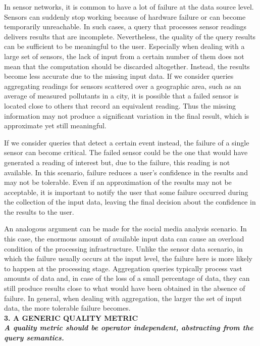 In sensor networks, it is common to have a lot of failure at the data source level. Sensors can suddenly
stop working because of hardware failure or can become temporarily unreachable. In such cases, a query
that processes sensor readings delivers results that are incomplete. Nevertheless, the quality of the
query results can be sufficient to be meaningful to the user. Especially when dealing with a large set of
sensors, the lack of input from a certain number of them does not mean that the computation should be
discarded altogether. Instead, the results become less accurate due to the missing input data. If we
consider queries aggregating readings for sensors scattered over a geographic area, such as an average of
measured pollutants in a city, it is possible that a failed sensor is located close to others that
record an equivalent reading. Thus the missing information may not produce a significant variation in the final
result, which is approximate yet still meaningful.
	
If we consider queries that detect a certain event instead, the failure of a single sensor can become
critical. The failed sensor could be the one that would have generated a reading of interest but, due to
the failure, this reading is not available. In this scenario, failure reduces a user's confidence in the
results and may not be tolerable. Even if an approximation of the results may not be acceptable, it is
important to notify the user that some failure occurred during the collection of the input data, leaving
the final decision about the confidence in the results to the user.
	
An analogous argument can be made for the social media analysis scenario. In this case, the enormous
amount of available input data can cause an overload condition of the processing infrastructure.
Unlike the sensor data scenario, in which the failure usually occurs at the input level, the failure here
is more likely to happen at the processing stage. Aggregation queries typically process vast amounts of
data and, in case of the loss of a small percentage of data, they can still produce results close to what
would have been obtained in the absence of failure. In general, when dealing with aggregation, the larger
the set of input data, the more tolerable failure becomes.\\

\textbf{3. A GENERIC QUALITY METRIC \\ \textit{A quality metric should be operator independent, abstracting from
the query semantics.}}
 
